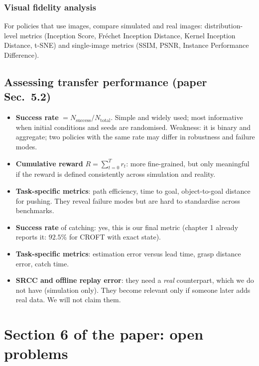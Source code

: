 \documentclass[11pt,a4paper]{article}
\begin{document}
\subsubsection*{Visual fidelity analysis}
For policies that use images, compare simulated and real images: distribution-level metrics
(Inception Score, Fr\'echet Inception Distance, Kernel Inception Distance, t-SNE) and
single-image metrics (SSIM, PSNR, Instance Performance Difference).

\subsection{Assessing transfer performance \textnormal{(paper Sec.~5.2)}}
\begin{itemize}
\item \textbf{Success rate} $=N_{\mathrm{success}}/N_{\mathrm{total}}$. Simple and widely used; most
informative when initial conditions and seeds are randomised. Weakness: it is binary and
aggregate; two policies with the same rate may differ in robustness and failure modes.
\item \textbf{Cumulative reward} $R=\sum_{t=0}^{T}r_t$: more fine-grained, but only meaningful if the
reward is defined consistently across simulation and reality.
\item \textbf{Task-specific metrics}: path efficiency, time to goal, object-to-goal distance for
pushing. They reveal failure modes but are hard to standardise across benchmarks.
\end{itemize}

\begin{ours}
\begin{itemize}
\item \textbf{Success rate} of catching: yes, this is our final metric (chapter 1 already reports
it: $92.5\%$ for CROFT with exact state).
\item \textbf{Task-specific metrics}: estimation error versus lead time, grasp distance error,
catch time.
\item \textbf{SRCC and offline replay error}: they need a \emph{real} counterpart, which we do not
have (simulation only). They become relevant only if someone later adds real data. We will not
claim them.
\end{itemize}
\end{ours}

\section{Section 6 of the paper: open problems}
\end{document}
